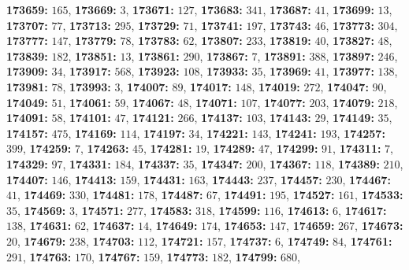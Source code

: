 \textsf{\bfseries 173659:} $165$, \textsf{\bfseries 173669:} $3$, \textsf{\bfseries 173671:} $127$, \textsf{\bfseries 173683:} $341$, \textsf{\bfseries 173687:} $41$, \textsf{\bfseries 173699:} $13$, \textsf{\bfseries 173707:} $77$, \textsf{\bfseries 173713:} $295$, \textsf{\bfseries 173729:} $71$, \textsf{\bfseries 173741:} $197$, \textsf{\bfseries 173743:} $46$, \textsf{\bfseries 173773:} $304$, \textsf{\bfseries 173777:} $147$, \textsf{\bfseries 173779:} $78$, \textsf{\bfseries 173783:} $62$, \textsf{\bfseries 173807:} $233$, \textsf{\bfseries 173819:} $40$, \textsf{\bfseries 173827:} $48$, \textsf{\bfseries 173839:} $182$, \textsf{\bfseries 173851:} $13$, \textsf{\bfseries 173861:} $290$, \textsf{\bfseries 173867:} $7$, \textsf{\bfseries 173891:} $388$, \textsf{\bfseries 173897:} $246$, \textsf{\bfseries 173909:} $34$, \textsf{\bfseries 173917:} $568$, \textsf{\bfseries 173923:} $108$, \textsf{\bfseries 173933:} $35$, \textsf{\bfseries 173969:} $41$, \textsf{\bfseries 173977:} $138$, \textsf{\bfseries 173981:} $78$, \textsf{\bfseries 173993:} $3$, \textsf{\bfseries 174007:} $89$, \textsf{\bfseries 174017:} $148$, \textsf{\bfseries 174019:} $272$, \textsf{\bfseries 174047:} $90$, \textsf{\bfseries 174049:} $51$, \textsf{\bfseries 174061:} $59$, \textsf{\bfseries 174067:} $48$, \textsf{\bfseries 174071:} $107$, \textsf{\bfseries 174077:} $203$, \textsf{\bfseries 174079:} $218$, \textsf{\bfseries 174091:} $58$, \textsf{\bfseries 174101:} $47$, \textsf{\bfseries 174121:} $266$, \textsf{\bfseries 174137:} $103$, \textsf{\bfseries 174143:} $29$, \textsf{\bfseries 174149:} $35$, \textsf{\bfseries 174157:} $475$, \textsf{\bfseries 174169:} $114$, \textsf{\bfseries 174197:} $34$, \textsf{\bfseries 174221:} $143$, \textsf{\bfseries 174241:} $193$, \textsf{\bfseries 174257:} $399$, \textsf{\bfseries 174259:} $7$, \textsf{\bfseries 174263:} $45$, \textsf{\bfseries 174281:} $19$, \textsf{\bfseries 174289:} $47$, \textsf{\bfseries 174299:} $91$, \textsf{\bfseries 174311:} $7$, \textsf{\bfseries 174329:} $97$, \textsf{\bfseries 174331:} $184$, \textsf{\bfseries 174337:} $35$, \textsf{\bfseries 174347:} $200$, \textsf{\bfseries 174367:} $118$, \textsf{\bfseries 174389:} $210$, \textsf{\bfseries 174407:} $146$, \textsf{\bfseries 174413:} $159$, \textsf{\bfseries 174431:} $163$, \textsf{\bfseries 174443:} $237$, \textsf{\bfseries 174457:} $230$, \textsf{\bfseries 174467:} $41$, \textsf{\bfseries 174469:} $330$, \textsf{\bfseries 174481:} $178$, \textsf{\bfseries 174487:} $67$, \textsf{\bfseries 174491:} $195$, \textsf{\bfseries 174527:} $161$, \textsf{\bfseries 174533:} $35$, \textsf{\bfseries 174569:} $3$, \textsf{\bfseries 174571:} $277$, \textsf{\bfseries 174583:} $318$, \textsf{\bfseries 174599:} $116$, \textsf{\bfseries 174613:} $6$, \textsf{\bfseries 174617:} $138$, \textsf{\bfseries 174631:} $62$, \textsf{\bfseries 174637:} $14$, \textsf{\bfseries 174649:} $174$, \textsf{\bfseries 174653:} $147$, \textsf{\bfseries 174659:} $267$, \textsf{\bfseries 174673:} $20$, \textsf{\bfseries 174679:} $238$, \textsf{\bfseries 174703:} $112$, \textsf{\bfseries 174721:} $157$, \textsf{\bfseries 174737:} $6$, \textsf{\bfseries 174749:} $84$, \textsf{\bfseries 174761:} $291$, \textsf{\bfseries 174763:} $170$, \textsf{\bfseries 174767:} $159$, \textsf{\bfseries 174773:} $182$, \textsf{\bfseries 174799:} $680$, 
